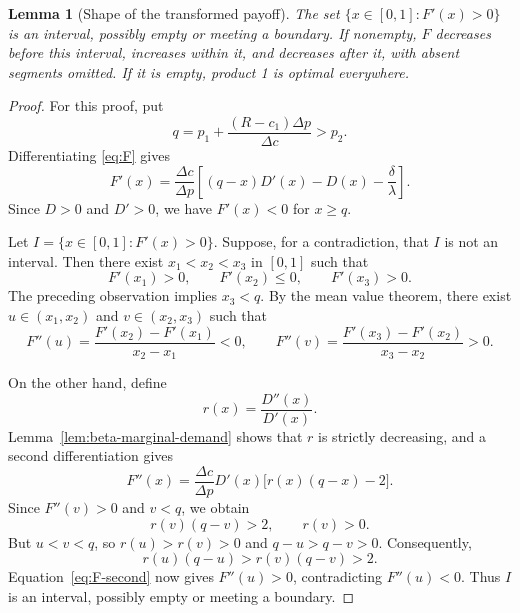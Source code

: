 \documentclass[11pt]{article}
\newtheorem{lemma}{Lemma}
\begin{document}
\begin{lemma}[Shape of the transformed payoff]\label{lem:F-shape}
The set $\{x\in[0,1]:F'(x)>0\}$ is an interval, possibly empty or
meeting a boundary. If nonempty, $F$ decreases before this interval,
increases within it, and decreases after it, with absent segments omitted.
If it is empty, product 1 is optimal everywhere.
\end{lemma}
\begin{proof}
For this proof, put
\begin{equation*}
q=p_1+\frac{(R-c_1)\Delta p}{\Delta c}>p_2.
\end{equation*}
Differentiating \eqref{eq:F} gives
\begin{equation*}
F'(x)=\frac{\Delta c}{\Delta p}
\left[(q-x)D'(x)-D(x)-\frac\delta\lambda\right].
\end{equation*}
Since $D>0$ and $D'>0$, we have $F'(x)<0$ for $x\ge q$.

Let $I=\{x\in[0,1]:F'(x)>0\}$. Suppose, for a contradiction, that
$I$ is not an interval. Then there exist $x_1<x_2<x_3$ in $[0,1]$
such that
\begin{equation*}
F'(x_1)>0,\qquad F'(x_2)\le0,\qquad F'(x_3)>0.
\end{equation*}
The preceding observation implies $x_3<q$. By the mean value theorem,
there exist $u\in(x_1,x_2)$ and $v\in(x_2,x_3)$ such that
\begin{equation*}
F''(u)=\frac{F'(x_2)-F'(x_1)}{x_2-x_1}<0,
\qquad
F''(v)=\frac{F'(x_3)-F'(x_2)}{x_3-x_2}>0.
\end{equation*}

On the other hand, define
\begin{equation*}
r(x)=\frac{D''(x)}{D'(x)}.
\end{equation*}
Lemma~\ref{lem:beta-marginal-demand} shows that $r$ is strictly decreasing,
and a second differentiation gives
\begin{equation}\label{eq:F-second}
F''(x)=\frac{\Delta c}{\Delta p}D'(x)
       \bigl[r(x)(q-x)-2\bigr].
\end{equation}
Since $F''(v)>0$ and $v<q$, we obtain
\begin{equation*}
r(v)(q-v)>2,\qquad r(v)>0.
\end{equation*}
But $u<v<q$, so $r(u)>r(v)>0$ and $q-u>q-v>0$. Consequently,
\begin{equation*}
r(u)(q-u)>r(v)(q-v)>2.
\end{equation*}
Equation~\eqref{eq:F-second} now gives $F''(u)>0$, contradicting
$F''(u)<0$. Thus $I$ is an interval, possibly empty or meeting a boundary.


\end{proof}
\end{document}
